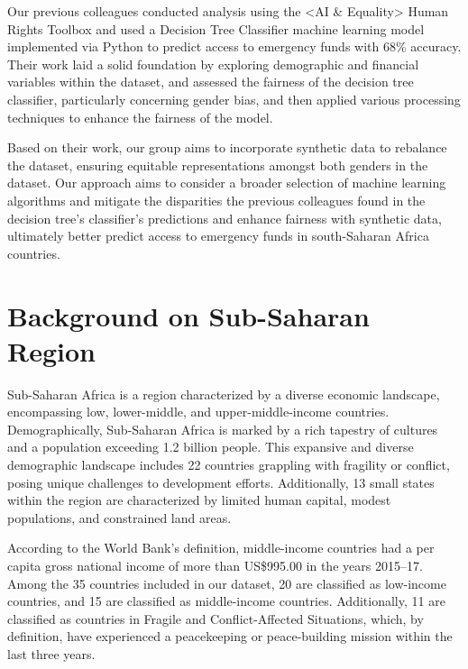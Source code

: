 \documentclass[12pt]{article}
\begin{document}
Our previous colleagues conducted analysis using the \textless AI \&
Equality\textgreater{} Human Rights Toolbox and used a Decision Tree
Classifier machine learning model implemented via Python to predict
access to emergency funds with 68\% accuracy. Their work laid a solid
foundation by exploring demographic and financial variables within the
dataset, and assessed the fairness of the decision tree classifier,
particularly concerning gender bias, and then applied various processing
techniques to enhance the fairness of the model\citep{Porta2022}.

Based on their work, our group aims to incorporate synthetic data to
rebalance the dataset, ensuring equitable representations amongst both
genders in the dataset. Our approach aims to consider a broader
selection of machine learning algorithms and mitigate the disparities
the previous colleagues found in the decision tree's classifier's
predictions and enhance fairness with synthetic data, ultimately better
predict access to emergency funds in south-Saharan Africa
countries\citep{SyntheticDataAIEquality}.

\hypertarget{background-on-sub-saharan-region}{%
\section{Background on Sub-Saharan
Region}\label{background-on-sub-saharan-region}}

Sub-Saharan Africa is a region characterized by a diverse economic
landscape, encompassing low, lower-middle, and upper-middle-income
countries. Demographically, Sub-Saharan Africa is marked by a rich
tapestry of cultures and a population exceeding 1.2 billion people. This
expansive and diverse demographic landscape includes 22 countries
grappling with fragility or conflict, posing unique challenges to
development efforts. Additionally, 13 small states within the region are
characterized by limited human capital, modest populations, and
constrained land areas.

According to the World Bank's definition, middle-income countries had a
per capita gross national income of more than US\$995.00 in the years
2015--17. Among the 35 countries included in our dataset, 20 are
classified as low-income countries, and 15 are classified as
middle-income countries. Additionally, 11 are classified as countries in
Fragile and Conflict-Affected Situations, which, by definition, have
experienced a peacekeeping or peace-building mission within the last
three years.
\end{document}
